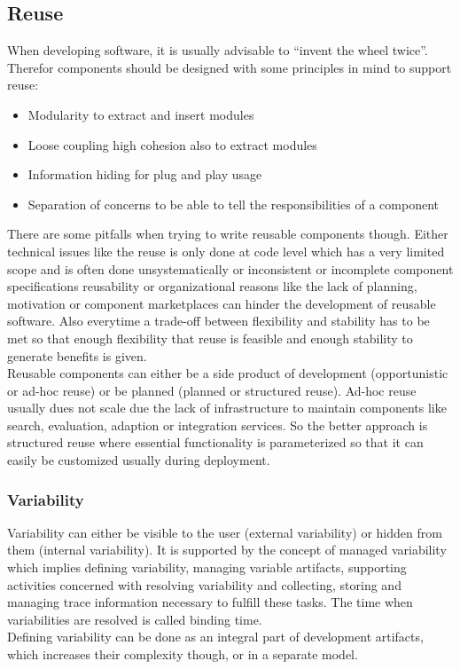 \subsection{Reuse}
When developing software, it is usually advisable to ``invent the wheel twice''.
Therefor components should be designed with some principles in mind to support reuse:
\begin{itemize}
  \item Modularity to extract and insert modules
  \item Loose coupling high cohesion also to extract modules
  \item Information hiding for plug and play usage
  \item Separation of concerns to be able to tell the responsibilities of a component
\end{itemize}
There are some pitfalls when trying to write reusable components though.
Either technical issues like the reuse is only done at code level which has a very limited scope and is often done unsystematically  or inconsistent or incomplete component specifications reusability or organizational reasons like the lack of planning, motivation or component marketplaces can hinder the development of reusable software.
Also everytime a trade-off between flexibility and stability has to be met so that enough flexibility that reuse is feasible and enough stability to generate benefits is given.\\
Reusable components can either be a side product of development (opportunistic or ad-hoc reuse) or be planned (planned or structured reuse).
Ad-hoc reuse usually dues not scale due the lack of infrastructure to maintain components like search, evaluation, adaption or integration services.
So the better approach is structured reuse where essential functionality is parameterized so that it can easily be customized usually during deployment.\\

\subsubsection{Variability}
Variability can either be visible to the user (external variability) or hidden from them (internal variability).
It is supported by the concept of managed variability which implies defining variability, managing variable artifacts, supporting activities concerned with resolving variability and collecting, storing and managing trace information necessary to fulfill these tasks.
The time when variabilities are resolved is called binding time.\\
Defining variability can be done as an integral part of development artifacts, which increases their complexity though, or in a separate model.

